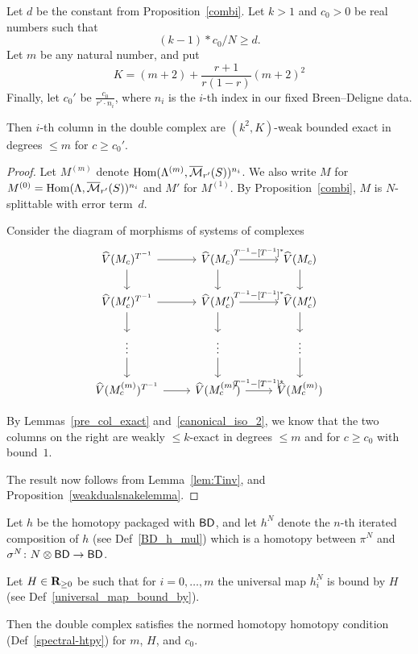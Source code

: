 \begin{proposition}
  \label{col_exact}
  \leanok
  Let $d$ be the constant from Proposition~\ref{combi}.
  Let $k > 1$ and $c_0 > 0$ be real numbers such that
  \[
    (k - 1) * c_0 / N \ge d.
  \]
  Let $m$ be any natural number, and put
  \[
    K = (m + 2) + \frac{r + 1}{r(1 - r)} (m + 2)^2
  \]
  Finally, let $c_0'$ be $\frac{c_0}{r' \cdot n_i}$,
  where $n_i$ is the $i$-th index in our fixed Breen--Deligne data.

  Then $i$-th column in the double complex
  are $(k^2, K)$-weak bounded exact in degrees $\le m$ for $c \ge c_0'$.
\end{proposition}

\begin{proof}\leanok
  Let $M^{(m)}$ denote $\operatorname{Hom}(\Lambda^{(m)},\overline{\mathcal M}_{r'}(S))^{n_i}$.
  We also write $M$ for $M^{(0)} = \operatorname{Hom}(\Lambda,\overline{\mathcal M}_{r'}(S))^{n_i}$
  and $M'$ for $M^{(1)}$.
  By Proposition~\ref{combi}, $M$ is $N$-splittable with error term~$d$.

  Consider the diagram of morphisms of systems of complexes
  \[
    \begin{tikzcd}
      \hat V(M_c)^{T^{-1}} \rar\dar & \hat V(M_c) \rar["{T^{-1} - [T^{-1}]^*}"]\dar & \hat V(M_c) \dar \\
      \hat V(M'_c)^{T^{-1}} \rar\dar & \hat V(M'_c) \rar["{T^{-1} - [T^{-1}]^*}"]\dar & \hat V(M'_c) \dar \\
      \vdots \dar & \vdots \dar & \vdots \dar \\
      \hat V(M^{(m)}_c)^{T^{-1}} \rar & \hat V(M^{(m)}_c) \rar["{T^{-1} - [T^{-1}]^*}"] & \hat V(M^{(m)}_c)
    \end{tikzcd}
  \]

  By Lemmas~\ref{pre_col_exact} and~\ref{canonical_iso_2},
  we know that the two columns on the right are
  weakly $\le k$-exact in degrees $\le m$ and for $c \ge c_0$ with bound~$1$.

  The result now follows from Lemma~\ref{lem:Tinv}, and Proposition~\ref{weakdualsnakelemma}.
\end{proof}

\begin{proposition}
  \label{double-complex-htpy}
  \leanok
  Let $h$ be the homotopy packaged with $\mathsf{BD}$,
  and let $h^N$ denote the $n$-th iterated composition of $h$
  (see Def~\ref{BD_h_mul})
  which is a homotopy between
  $\pi^N$ and $\sigma^N \colon N \otimes \mathsf{BD} \to \mathsf{BD}$.

  Let $H \in \mathbf{R}_{\ge 0}$ be such that for $i = 0, \dots, m$
  the universal map $h^N_i$ is bound by $H$
  (see Def~\ref{universal_map_bound_by}).

  Then the double complex satisfies
  the normed homotopy homotopy condition (Def~\ref{spectral-htpy})
  for $m$, $H$, and $c_0$.
\end{proposition}

